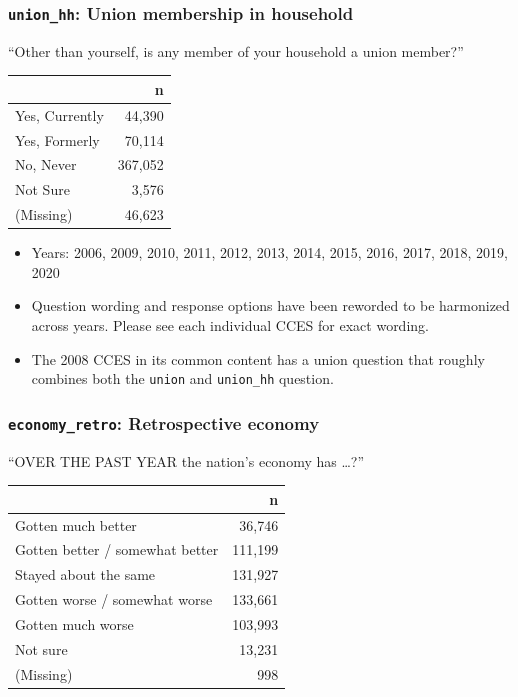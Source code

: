 \documentclass[10pt,article,oneside]{memoir}
\theoremstyle{definition}
\begin{document}
\hypertarget{union_hh-union-membership-in-household}{%
\subsubsection{\texorpdfstring{\texttt{union\_hh}: Union membership in
household}{union\_hh: Union membership in household}}\label{union_hh-union-membership-in-household}}

``Other than yourself, is any member of your household a union member?''

\begin{table}[H]
\centering
\begin{tabular}[t]{lr}
\toprule
 & n\\
\midrule
Yes, Currently & 44,390\\
Yes, Formerly & 70,114\\
No, Never & 367,052\\
Not Sure & 3,576\\
(Missing) & 46,623\\
\bottomrule
\end{tabular}
\end{table}

\begin{itemize}
\tightlist
\item
  Years: 2006, 2009, 2010, 2011, 2012, 2013, 2014, 2015, 2016, 2017,
  2018, 2019, 2020
\item
  Question wording and response options have been reworded to be
  harmonized across years. Please see each individual CCES for exact
  wording.
\item
  The 2008 CCES in its common content has a union question that roughly
  combines both the \texttt{union} and \texttt{union\_hh} question.
\end{itemize}

\hypertarget{economy_retro-retrospective-economy}{%
\subsubsection{\texorpdfstring{\texttt{economy\_retro}: Retrospective
economy}{economy\_retro: Retrospective economy}}\label{economy_retro-retrospective-economy}}

``OVER THE PAST YEAR the nation's economy has \ldots?''

\begin{table}[H]
\centering
\begin{tabular}[t]{lr}
\toprule
 & n\\
\midrule
Gotten much better & 36,746\\
Gotten better / somewhat better & 111,199\\
Stayed about the same & 131,927\\
Gotten worse / somewhat worse & 133,661\\
Gotten much worse & 103,993\\
Not sure & 13,231\\
(Missing) & 998\\
\bottomrule
\end{tabular}
\end{table}
\end{document}
